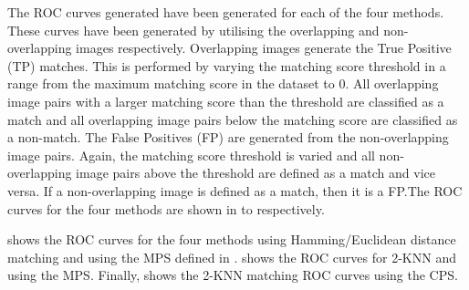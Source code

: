 \documentclass{article}
\begin{document}
The ROC curves generated have been generated for each of the four methods. These curves have been generated by utilising the overlapping and non-overlapping images respectively. Overlapping images generate the True Positive (TP) matches. This is performed by varying the matching score threshold in a range from the maximum matching score in the dataset to $0$.  All overlapping image pairs with a larger matching score than the threshold are classified as a match and all overlapping image pairs below the matching score are classified as a non-match. The False Positives (FP) are generated from the non-overlapping image pairs. Again, the matching score threshold is varied and all non-overlapping image pairs above the threshold are defined as a match and vice versa. If a non-overlapping image is defined as a match, then it is a FP.The ROC curves for the four methods are shown in  to  respectively.

 shows the ROC curves for the four methods using Hamming/Euclidean distance matching and using the MPS defined in . shows the ROC curves for 2-KNN and using the MPS. Finally,  shows the 2-KNN matching ROC curves using the CPS.
\end{document}

